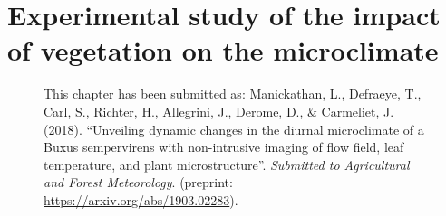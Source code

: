 \chapter{Experimental study of the impact of vegetation on the microclimate}
\label{ch:microclimatestudy}
\def\figdir{chapters/ch04_microclimatestudy/figures}


\begin{figure}[h]
	\centering
	\begin{minipage}{0.9\textwidth}
		\textsf{ \footnotesize This chapter has been submitted as: Manickathan, L., Defraeye, T., Carl, S., Richter, H., Allegrini, J., Derome, D., \& Carmeliet, J. (2018). ``Unveiling dynamic changes in the diurnal microclimate of a Buxus sempervirens with non-intrusive imaging of flow field, leaf temperature, and plant microstructure''. \textit{Submitted to Agricultural and Forest Meteorology}. (preprint: \url{https://arxiv.org/abs/1903.02283}). }
	\end{minipage}
\end{figure}
\vspace{2em}


